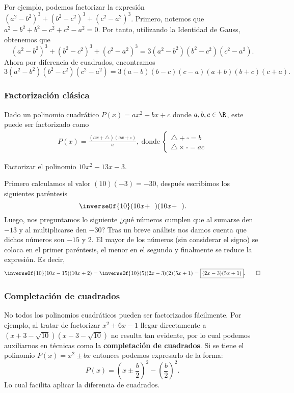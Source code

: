 Por ejemplo, podemos factorizar la expresión $(a^2 - b^2)^3 + (b^2 - c^2)^3 + (c^2 - a^2)^3$.
Primero, notemos que $a^2 - b^2 + b^2 - c^2 + c^2 - a^2 = 0$.
Por tanto, utilizando la Identidad de Gauss, obtenemos que
\[
    (a^2 - b^2)^3 + (b^2 - c^2)^3 + (c^2 - a^2)^3 = 3 (a^2 - b^2)(b^2 - c^2)(c^2 - a^2).
\]
Ahora por diferencia de cuadrados, encontramos
\[
    3 (a^2 - b^2)(b^2 - c^2)(c^2 - a^2) = 3 (a - b)(b - c)(c - a) (a + b)(b + c)(c + a).
\]



\subsubsection{Factorización clásica}

Dado un polinomio cuadrático $P(x) = ax^2 + bx + c$ donde $a, b, c \in \R$, este puede ser factorizado como
\begin{gather*}
    P(x) = \frac{(ax + \triangle)(ax + \square)}{a},\ \text{donde}\
    \begin{cases}
        \triangle + \square = b\\
        \triangle \times \square = ac
    \end{cases}
\end{gather*}

\begin{example}
    Factorizar el polinomio $10x^2 - 13x - 3$.
\end{example}
\begin{solution}
    Primero calculamos el valor $(10)(-3) = -30$, después escribimos los siguientes paréntesis
    \[
        \inverseOf{10} (10x + \ \ )(10x + \ \ ).
    \]
    Luego, nos preguntamos lo siguiente ¿qué números cumplen que al sumarse den $-13$ y al multiplicarse den $-30$?
    Tras un breve análisis nos damos cuenta que dichos números son $-15$ y 2.
    El mayor de los números (sin considerar el signo) se coloca en el primer paréntesis, el menor en el segundo y finalmente se reduce la expresión.
    Es decir,
    \[
        \inverseOf{10} (10x - 15)(10x + 2) = \inverseOf{10} (5)(2x - 3)(2)(5x + 1) = \boxed{(2x - 3)(5x + 1)}. \qedhere
    \]
\end{solution}



\subsubsection{Completación de cuadrados}

No todos los polinomios cuadráticos pueden ser factorizados fácilmente.
Por ejemplo, al tratar de factorizar $x^2 + 6x - 1$ llegar directamente a $(x + 3 - \sqrt {10})(x-3-\sqrt {10})$ no resulta tan evidente, por lo cual podemos auxiliarnos en técnicas como la \textbf{completación de cuadrados}.
Si se tiene el polinomio $P(x) = x^2 \pm bx$ entonces podemos expresarlo de la forma:
\[
    P(x) = \left( x \pm \frac{b}{2} \right)^2 - \left( \frac{b}{2} \right)^2.
\]
Lo cual facilita aplicar la diferencia de cuadrados.

